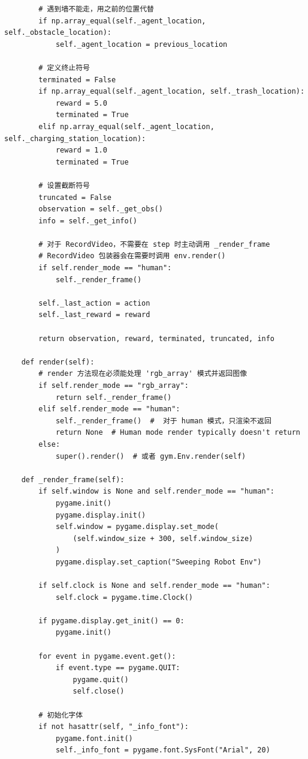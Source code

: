 \documentclass[citestyle=gb7714-2015, bibstyle=gb7714-2015,lang=cn,14pt,scheme=chinese]{elegantbook}
\begin{document}
\begin{verbatim}
        # 遇到墙不能走，用之前的位置代替
        if np.array_equal(self._agent_location, self._obstacle_location):
            self._agent_location = previous_location

        # 定义终止符号
        terminated = False
        if np.array_equal(self._agent_location, self._trash_location):
            reward = 5.0
            terminated = True
        elif np.array_equal(self._agent_location, self._charging_station_location):
            reward = 1.0
            terminated = True

        # 设置截断符号
        truncated = False
        observation = self._get_obs()
        info = self._get_info()

        # 对于 RecordVideo，不需要在 step 时主动调用 _render_frame
        # RecordVideo 包装器会在需要时调用 env.render()
        if self.render_mode == "human":
            self._render_frame()

        self._last_action = action
        self._last_reward = reward

        return observation, reward, terminated, truncated, info

    def render(self):
        # render 方法现在必须能处理 'rgb_array' 模式并返回图像
        if self.render_mode == "rgb_array":
            return self._render_frame()
        elif self.render_mode == "human":
            self._render_frame()  #  对于 human 模式，只渲染不返回
            return None  # Human mode render typically doesn't return
        else:
            super().render()  # 或者 gym.Env.render(self)

    def _render_frame(self):
        if self.window is None and self.render_mode == "human":
            pygame.init()
            pygame.display.init()
            self.window = pygame.display.set_mode(
                (self.window_size + 300, self.window_size)
            )
            pygame.display.set_caption("Sweeping Robot Env")

        if self.clock is None and self.render_mode == "human":
            self.clock = pygame.time.Clock()

        if pygame.display.get_init() == 0:
            pygame.init()

        for event in pygame.event.get():
            if event.type == pygame.QUIT:
                pygame.quit()
                self.close()

        # 初始化字体
        if not hasattr(self, "_info_font"):
            pygame.font.init()
            self._info_font = pygame.font.SysFont("Arial", 20)


\end{verbatim}
\end{document}
